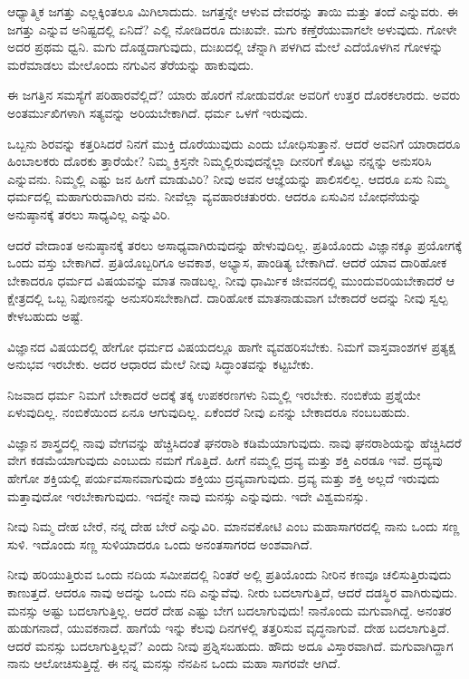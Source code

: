 ಆಧ್ಯಾತ್ಮಿಕ ಜಗತ್ತು ಎಲ್ಲಕ್ಕಿಂತಲೂ ಮಿಗಿಲಾದುದು. ಜಗತ್ತನ್ನೇ ಆಳುವ ದೇವರನ್ನು ತಾಯಿ ಮತ್ತು ತಂದೆ ಎನ್ನುವರು. ಈ ಜಗತ್ತು ಎನ್ನುವ ಅನಿಷ್ಟದಲ್ಲಿ ಏನಿದೆ? ಎಲ್ಲಿ ನೋಡಿದರೂ ದುಃಖವೇ. ಮಗು ಕಣ್ತೆರೆಯುವಾಗಲೇ ಅಳುವುದು. ಗೋಳೇ ಅದರ ಪ್ರಥಮ ಧ್ವನಿ. ಮಗು ದೊಡ್ಡದಾಗುವುದು, ದುಃಖದಲ್ಲಿ ಚೆನ್ನಾಗಿ ಪಳಗಿದ ಮೇಲೆ ಎದೆಯೊಳಗಿನ ಗೋಳನ್ನು ಮರೆಮಾಡಲು ಮೇಲೊಂದು ನಗುವಿನ ತೆರೆಯನ್ನು ಹಾಕುವುದು.

ಈ ಜಗತ್ತಿನ ಸಮಸ್ಯೆಗೆ ಪರಿಹಾರವೆಲ್ಲಿದೆ? ಯಾರು ಹೊರಗೆ ನೋಡುವರೋ ಅವರಿಗೆ ಉತ್ತರ ದೊರಕಲಾರದು. ಅವರು ಅಂತರ್ಮುಖಿಗಳಾಗಿ ಸತ್ಯವನ್ನು ಅರಿಯಬೇಕಾಗಿದೆ. ಧರ್ಮ ಒಳಗೆ ಇರುವುದು.

ಒಬ್ಬನು ಶಿರವನ್ನು ಕತ್ತರಿಸಿದರೆ ನಿನಗೆ ಮುಕ್ತಿ ದೊರೆಯುವುದು ಎಂದು ಬೋಧಿಸುತ್ತಾನೆ. ಆದರೆ ಅವನಿಗೆ ಯಾರಾದರೂ ಹಿಂಬಾಲಕರು ದೊರಕು ತ್ತಾರೆಯೇ? ನಿಮ್ಮ ಕ್ರಿಸ್ತನೇ ನಿಮ್ಮಲ್ಲಿರುವುದನ್ನೆಲ್ಲಾ ದೀನರಿಗೆ ಕೊಟ್ಟು ನನ್ನನ್ನು ಅನುಸರಿಸಿ ಎನ್ನುವನು. ನಿಮ್ಮಲ್ಲಿ ಎಷ್ಟು ಜನ ಹೀಗೆ ಮಾಡುವಿರಿ? ನೀವು ಅವನ ಆಜ್ಞೆಯನ್ನು ಪಾಲಿಸಲಿಲ್ಲ. ಆದರೂ ಏಸು ನಿಮ್ಮ ಧರ್ಮದಲ್ಲಿ ಮಹಾಗುರುವಾಗಿರು ವನು. ನೀವೆಲ್ಲಾ ವ್ಯವಹಾರಚತುರರು. ಆದರೂ ಏಸುವಿನ ಬೋಧನೆಯನ್ನು ಅನುಷ್ಠಾನಕ್ಕೆ ತರಲು ಸಾಧ್ಯವಿಲ್ಲ ಎನ್ನುವಿರಿ.

ಆದರೆ ವೇದಾಂತ ಅನುಷ್ಠಾನಕ್ಕೆ ತರಲು ಅಸಾಧ್ಯವಾಗಿರುವುದನ್ನು ಹೇಳುವುದಿಲ್ಲ. ಪ್ರತಿಯೊಂದು ವಿಜ್ಞಾನಕ್ಕೂ ಪ್ರಯೋಗಕ್ಕೆ ಒಂದು ವಸ್ತು ಬೇಕಾಗಿದೆ. ಪ್ರತಿಯೊಬ್ಬರಿಗೂ ಅವಕಾಶ, ಅಭ್ಯಾಸ, ಪಾಂಡಿತ್ಯ ಬೇಕಾಗಿದೆ. ಆದರೆ ಯಾವ ದಾರಿಹೋಕ ಬೇಕಾದರೂ ಧರ್ಮದ ವಿಷಯವನ್ನು ಮಾತ ನಾಡಬಲ್ಲ. ನೀವು ಧಾರ್ಮಿಕ ಜೀವನದಲ್ಲಿ ಮುಂದುವರಿಯಬೇಕಾದರೆ ಆ ಕ್ಷೇತ್ರದಲ್ಲಿ ಒಬ್ಬ ನಿಪುಣನನ್ನು ಅನುಸರಿಸಬೇಕಾಗಿದೆ. ದಾರಿಹೋಕ ಮಾತನಾಡುವಾಗ ಬೇಕಾದರೆ ಅದನ್ನು ನೀವು ಸ್ವಲ್ಪ ಕೇಳಬಹುದು ಅಷ್ಟೆ.

ವಿಜ್ಞಾನದ ವಿಷಯದಲ್ಲಿ ಹೇಗೋ ಧರ್ಮದ ವಿಷಯದಲ್ಲೂ ಹಾಗೇ ವ್ಯವಹರಿಸಬೇಕು. ನಿಮಗೆ ವಾಸ್ತವಾಂಶಗಳ ಪ್ರತ್ಯಕ್ಷ ಅನುಭವ ಇರಬೇಕು. ಅದರ ಆಧಾರದ ಮೇಲೆ ನೀವು ಸಿದ್ಧಾಂತವನ್ನು ಕಟ್ಟಬೇಕು.

ನಿಜವಾದ ಧರ್ಮ ನಿಮಗೆ ಬೇಕಾದರೆ ಅದಕ್ಕೆ ತಕ್ಕ ಉಪಕರಣಗಳು ನಿಮ್ಮಲ್ಲಿ ಇರಬೇಕು. ನಂಬಿಕೆಯ ಪ್ರಶ್ನೆಯೇ ಏಳುವುದಿಲ್ಲ. ನಂಬಿಕೆಯಿಂದ ಏನೂ ಆಗುವುದಿಲ್ಲ. ಏಕೆಂದರೆ ನೀವು ಏನನ್ನು ಬೇಕಾದರೂ ನಂಬಬಹುದು.

ವಿಜ್ಞಾನ ಶಾಸ್ತ್ರದಲ್ಲಿ ನಾವು ವೇಗವನ್ನು ಹೆಚ್ಚಿಸಿದಂತೆ ಘನರಾಶಿ  ಕಡಿಮೆಯಾಗುವುದು. ನಾವು ಘನರಾಶಿಯನ್ನು  ಹೆಚ್ಚಿಸಿದರೆ ವೇಗ ಕಡಮೆಯಾಗುವುದು ಎಂಬುದು ನಮಗೆ ಗೊತ್ತಿದೆ. ಹೀಗೆ ನಮ್ಮಲ್ಲಿ ದ್ರವ್ಯ ಮತ್ತು ಶಕ್ತಿ ಎರಡೂ ಇವೆ. ದ್ರವ್ಯವು ಹೇಗೋ ಶಕ್ತಿಯಲ್ಲಿ ಪರ್ಯವಸಾನವಾಗುವುದು ಶಕ್ತಿಯು ದ್ರವ್ಯವಾಗುವುದು. ದ್ರವ್ಯ ಮತ್ತು ಶಕ್ತಿ ಅಲ್ಲದೆ ಇರುವುದು ಮತ್ತಾವುದೋ ಇರಬೇಕಾಗುವುದು. ಇದನ್ನೇ ನಾವು ಮನಸ್ಸು ಎನ್ನುವುದು. ಇದೇ ವಿಶ್ವಮನಸ್ಸು.

ನೀವು ನಿಮ್ಮ ದೇಹ ಬೇರೆ, ನನ್ನ ದೇಹ ಬೇರೆ ಎನ್ನುವಿರಿ. ಮಾನವಕೋಟಿ ಎಂಬ ಮಹಾಸಾಗರದಲ್ಲಿ ನಾನು ಒಂದು ಸಣ್ಣ ಸುಳಿ. ಇದೊಂದು ಸಣ್ಣ ಸುಳಿಯಾದರೂ ಒಂದು ಅನಂತಸಾಗರದ ಅಂಶವಾಗಿದೆ.

ನೀವು ಹರಿಯುತ್ತಿರುವ ಒಂದು ನದಿಯ ಸಮೀಪದಲ್ಲಿ ನಿಂತರೆ ಅಲ್ಲಿ ಪ್ರತಿಯೊಂದು ನೀರಿನ ಕಣವೂ ಚಲಿಸುತ್ತಿರುವುದು ಕಾಣುತ್ತದೆ. ಆದರೂ ನಾವು ಅದನ್ನು ಒಂದು ನದಿ ಎನ್ನುವೆವು. ನೀರು ಬದಲಾಗುತ್ತಿದೆ, ಆದರೆ ದಡಸ್ಥಿರ ವಾಗಿರುವುದು. ಮನಸ್ಸು ಅಷ್ಟು ಬದಲಾಗುತ್ತಿಲ್ಲ. ಆದರೆ ದೇಹ ಎಷ್ಟು ಬೇಗ ಬದಲಾಗುವುದು! ನಾನೊಂದು ಮಗುವಾಗಿದ್ದೆ. ಅನಂತರ ಹುಡುಗನಾದೆ, ಯುವಕನಾದೆ. ಹಾಗೆಯೆ ಇನ್ನು ಕೆಲವು ದಿನಗಳಲ್ಲಿ ತತ್ತರಿಸುವ ವೃದ್ಧನಾಗುವೆ. ದೇಹ ಬದಲಾಗುತ್ತಿದೆ. ಆದರೆ ಮನಸ್ಸು ಬದಲಾಗುತ್ತಿಲ್ಲವೆ? ಎಂದು ನೀವು ಪ್ರಶ್ನಿಸಬಹುದು. ಹೌದು ಅದೂ ವಿಸ್ತಾರವಾಗಿದೆ. ಮಗುವಾಗಿದ್ದಾಗ ನಾನು ಆಲೋಚಿಸುತ್ತಿದ್ದೆ. ಈ ನನ್ನ ಮನಸ್ಸು ನೆನಪಿನ ಒಂದು ಮಹಾ ಸಾಗರವೇ ಆಗಿದೆ.

